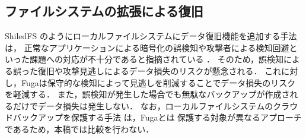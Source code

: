 \subsection{ファイルシステムの拡張による復旧}
ShiledFS \cite{shieldFS} のようにローカルファイルシステムにデータ復旧機能を追加する手法は，
正常なアプリケーションによる暗号化の誤検知や攻撃者による検知回避といった課題への対応が不十分であると指摘されている \cite{han2020effectiveness,css2024-enomoto}．
そのため，誤検知による誤った復旧や攻撃見逃しによるデータ損失のリスクが懸念される．
これに対し，Fugaは保守的な検知によって見逃しを削減することでデータ損失のリスクを軽減する．
また，誤検知が発生した場合でも無駄なバックアップが作成されるだけでデータ損失は発生しない．
なお，ローカルファイルシステムのクラウドバックアップを保護する手法 \cite{matos2018rockfs} は，Fugaとは
保護する対象が異なるアプローチであるため，本稿では比較を行わない．
